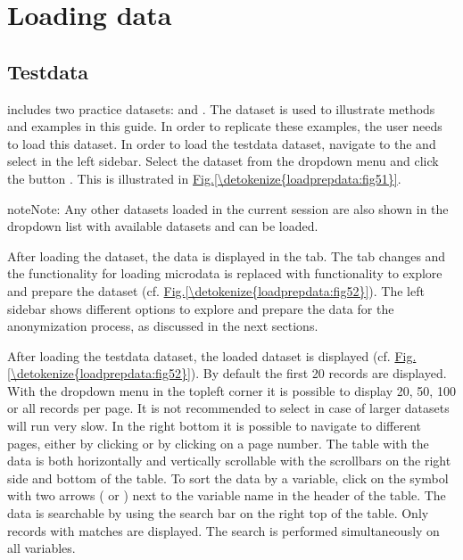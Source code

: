 \documentclass[letterpaper,10pt,english]{sphinxmanual}
\begin{document}
\section{Loading data}
\label{\detokenize{loadprepdata:loading-data}}

\subsection{Testdata}
\label{\detokenize{loadprepdata:testdata}}
 includes two practice datasets:  and . The dataset
 is used to illustrate methods and examples in this guide. In order to
replicate these examples, the user needs to load this dataset. In order to load the testdata
dataset, navigate to the  and select  in the left sidebar.
Select the dataset from the dropdown menu and click the button .
This is illustrated in \hyperref[\detokenize{loadprepdata:fig51}]{Fig.\@ \ref{\detokenize{loadprepdata:fig51}}}.

\begin{sphinxadmonition}{note}{Note:}
Any other datasets loaded in the current  session are also shown in the dropdown list
with available datasets and can be loaded.
\end{sphinxadmonition}

After loading the dataset, the data is displayed in the  tab. The 
tab changes and the functionality for loading microdata is replaced with
functionality to explore and prepare the dataset (cf. \hyperref[\detokenize{loadprepdata:fig52}]{Fig.\@ \ref{\detokenize{loadprepdata:fig52}}}). The
left sidebar shows different options to explore and prepare the data for the anonymization process,
as discussed in the next sections.

After loading the testdata dataset, the loaded
dataset is displayed (cf. \hyperref[\detokenize{loadprepdata:fig52}]{Fig.\@ \ref{\detokenize{loadprepdata:fig52}}}). By default the first 20 records are displayed.
With the dropdown menu in the topleft corner it is possible to display 20, 50, 100 or all
records per page. It is not recommended to select  in case of larger datasets
 will run very slow. In the right bottom it is possible to navigate to different pages,
either by clicking  or by clicking on a page number. The table
with the data is both horizontally and vertically scrollable with the scrollbars on the
right side and bottom of the table. To sort the data by a variable, click on the symbol
with two arrows ( or ) next to the variable name in the header of the table.
The data is searchable by using the search bar on the right top of the table. Only records
with matches are displayed. The search is performed simultaneously on all variables.
\end{document}
